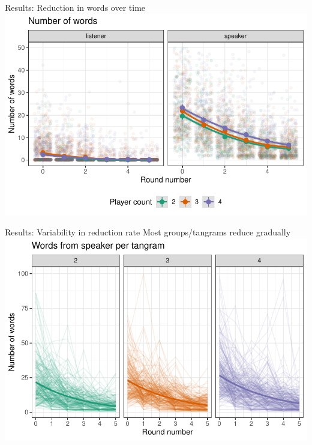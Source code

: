 \documentclass[ 12pt, xcolor=beamer,table,usenames,dvipsnames, ignorenonframetext, ngerman]{beamer}
\begin{document}
\begin{frame}{\large Results: Reduction in words over time}
\includegraphics[width=\textwidth]{../images/words.pdf}


\end{frame}

\begin{frame}{\large Results: Variability in reduction rate}
	Most groups/tangrams reduce gradually
	\includegraphics[width=\textwidth]{../images/words_lines.pdf}
\end{frame}
\end{document}
